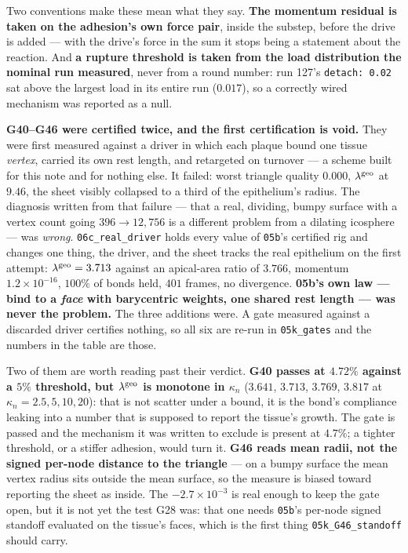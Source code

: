 \documentclass[10pt,a4paper]{article}
\newcommand{\code}[1]{\texttt{#1}}
\newcommand{\op}[1]{\texttt{#1}}
\begin{document}
Two conventions make these mean what they say. \textbf{The momentum residual is taken on the adhesion's
own force pair}, inside the substep, before the drive is added --- with the drive's force in the sum it
stops being a statement about the reaction. And \textbf{a rupture threshold is taken from the load
distribution the nominal run measured}, never from a round number: run 127's \code{detach: 0.02} sat
above the largest load in its entire run ($0.017$), so a correctly wired mechanism was reported as a
null.

\smallskip
\noindent\textbf{G40--G46 were certified twice, and the first certification is void.} They were first
measured against a driver in which each plaque bound one tissue \emph{vertex}, carried its own rest
length, and retargeted on turnover --- a scheme built for this note and for nothing else. It failed:
worst triangle quality $0.000$, $\lambda^{\rm geo}$ at $9.46$, the sheet visibly collapsed to a third
of the epithelium's radius. The diagnosis written from that failure --- that a real, dividing,
bumpy surface with a vertex count going $396\to12{,}756$ is a different problem from a dilating
icosphere --- was \emph{wrong}. \op{06c\_real\_driver} holds every value of \op{05b}'s certified rig
and changes one thing, the driver, and the sheet tracks the real epithelium on the first attempt:
$\lambda^{\rm geo}=3.713$ against an apical-area ratio of $3.766$, momentum $1.2\times10^{-16}$,
$100\%$ of bonds held, $401$ frames, no divergence. \textbf{05b's own law --- bind to a \emph{face}
with barycentric weights, one shared rest length --- was never the problem.} The three additions were.
A gate measured against a discarded driver certifies nothing, so all six are re-run in \op{05k\_gates}
and the numbers in the table are those.

\smallskip
\noindent Two of them are worth reading past their verdict. \textbf{G40 passes at $4.72\%$ against a
$5\%$ threshold, but $\lambda^{\rm geo}$ is monotone in $\kappa_n$} ($3.641$, $3.713$, $3.769$,
$3.817$ at $\kappa_n=2.5,5,10,20$): that is not scatter under a bound, it is the bond's compliance
leaking into a number that is supposed to report the tissue's growth. The gate is passed and the
mechanism it was written to exclude is present at $4.7\%$; a tighter threshold, or a stiffer adhesion,
would turn it. \textbf{G46 reads mean radii, not the signed per-node distance to the triangle} --- on
a bumpy surface the mean vertex radius sits outside the mean surface, so the measure is biased toward
reporting the sheet as inside. The $-2.7\times10^{-3}$ is real enough to keep the gate open, but it
is not yet the test G28 was: that one needs \op{05b}'s per-node signed standoff evaluated on the
tissue's faces, which is the first thing \op{05k\_G46\_standoff} should carry.
\end{document}

